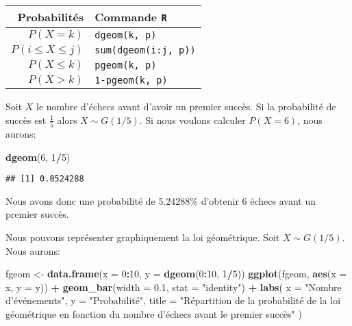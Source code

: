 \documentclass[]{book}
\newenvironment{Shaded}{\begin{snugshade}}{\end{snugshade}}
\newcommand{\KeywordTok}[1]{\textcolor[rgb]{0.13,0.29,0.53}{\textbf{#1}}}
\newcommand{\DataTypeTok}[1]{\textcolor[rgb]{0.13,0.29,0.53}{#1}}
\newcommand{\DecValTok}[1]{\textcolor[rgb]{0.00,0.00,0.81}{#1}}
\newcommand{\FloatTok}[1]{\textcolor[rgb]{0.00,0.00,0.81}{#1}}
\newcommand{\StringTok}[1]{\textcolor[rgb]{0.31,0.60,0.02}{#1}}
\newcommand{\OperatorTok}[1]{\textcolor[rgb]{0.81,0.36,0.00}{\textbf{#1}}}
\newcommand{\NormalTok}[1]{#1}
\begin{document}
\begin{longtable}[]{@{}rl@{}}
\toprule
Probabilités & Commande \texttt{R}\tabularnewline
\midrule
\endhead
\(P(X=k)\) & \texttt{dgeom(k,\ p)}\tabularnewline
\(P(i\leq X \leq j)\) & \texttt{sum(dgeom(i:j,\ p))}\tabularnewline
\(P(X\leq k)\) & \texttt{pgeom(k,\ p)}\tabularnewline
\(P(X>k)\) & \texttt{1-pgeom(k,\ p)}\tabularnewline
\bottomrule
\end{longtable}

Soit \(X\) le nombre d'échecs avant d'avoir un premier succès. Si la
probabilité de succès est \(\frac{1}{5}\) alors \(X\sim G(1/5)\). Si
nous voulons calculer \(P(X=6)\), nous aurons:

\begin{Shaded}
\begin{Highlighting}[]
\KeywordTok{dgeom}\NormalTok{(}\DecValTok{6}\NormalTok{, }\DecValTok{1}\OperatorTok{/}\DecValTok{5}\NormalTok{)}
\end{Highlighting}
\end{Shaded}

\begin{verbatim}
## [1] 0.0524288
\end{verbatim}

Nous avons donc une probabilité de 5.24288\% d'obtenir 6 échecs avant un
premier succès.

Nous pouvons représenter graphiquement la loi géométrique. Soit
\(X\sim G(1/5)\). Nous aurons:

\begin{Shaded}
\begin{Highlighting}[]
\NormalTok{fgeom <-}\StringTok{ }\KeywordTok{data.frame}\NormalTok{(}\DataTypeTok{x =} \DecValTok{0}\OperatorTok{:}\DecValTok{10}\NormalTok{, }\DataTypeTok{y =} \KeywordTok{dgeom}\NormalTok{(}\DecValTok{0}\OperatorTok{:}\DecValTok{10}\NormalTok{, }\DecValTok{1}\OperatorTok{/}\DecValTok{5}\NormalTok{))}
\KeywordTok{ggplot}\NormalTok{(fgeom, }\KeywordTok{aes}\NormalTok{(}\DataTypeTok{x =}\NormalTok{ x, }\DataTypeTok{y =}\NormalTok{ y)) }\OperatorTok{+}
\StringTok{  }\KeywordTok{geom_bar}\NormalTok{(}\DataTypeTok{width =} \FloatTok{0.1}\NormalTok{, }\DataTypeTok{stat =} \StringTok{"identity"}\NormalTok{) }\OperatorTok{+}
\StringTok{  }\KeywordTok{labs}\NormalTok{(}
    \DataTypeTok{x =} \StringTok{"Nombre d'événements"}\NormalTok{,}
    \DataTypeTok{y =} \StringTok{"Probabilité"}\NormalTok{,}
    \DataTypeTok{title =} \StringTok{"Répartition de la probabilité de la loi géométrique en fonction du nombre d'échecs avant le premier succès"}
\NormalTok{  )}
\end{Highlighting}
\end{Shaded}
\end{document}
